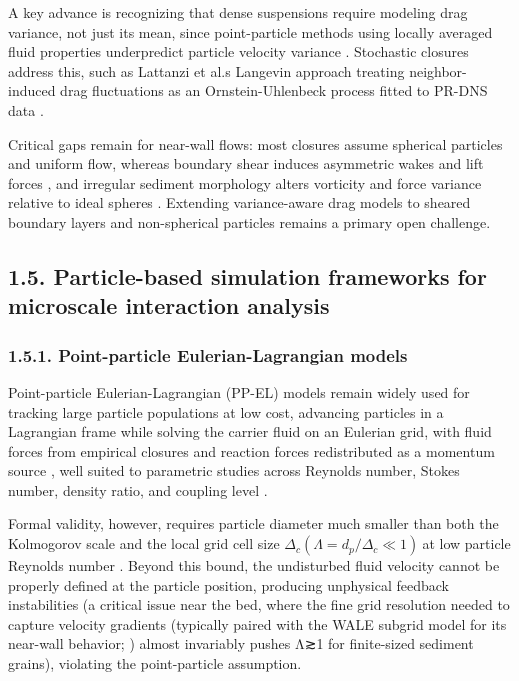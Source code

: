 A key advance is recognizing that dense suspensions require modeling drag variance, not just its mean, since point-particle methods using locally averaged fluid properties underpredict particle velocity variance \cite{brandt__2022,moore__2019}. Stochastic closures address this, such as Lattanzi et al.\textquotesingle s \cite{lattanzi__2021} Langevin approach treating neighbor-induced drag fluctuations as an Ornstein-Uhlenbeck process fitted to PR-DNS data \cite{osnes__2025}.

Critical gaps remain for near-wall flows: most closures assume spherical particles and uniform flow, whereas boundary shear induces asymmetric wakes and lift forces \cite{PEND_Costa2020,PEND_Costa2021}, and irregular sediment morphology alters vorticity and force variance relative to ideal spheres \cite{sanjeevi__2022,PEND_Zhao2024}. Extending variance-aware drag models to sheared boundary layers and non-spherical particles remains a primary open challenge.

\subsection{1.5. Particle-based simulation frameworks for microscale interaction analysis}

\subsubsection{1.5.1. Point-particle Eulerian-Lagrangian models}

Point-particle Eulerian-Lagrangian (PP-EL) models remain widely used for tracking large particle populations at low cost, advancing particles in a Lagrangian frame while solving the carrier fluid on an Eulerian grid, with fluid forces from empirical closures and reaction forces redistributed as a momentum source \cite{messa__2021,PEND_Shao2012,PEND_Zhang2023}, well suited to parametric studies across Reynolds number, Stokes number, density ratio, and coupling level \cite{PEND_Vreman2007,vreman__2015,zhou__2020}.

Formal validity, however, requires particle diameter much smaller than both the Kolmogorov scale and the local grid cell size \(\Delta_{c}(\Lambda = d_{p}/\Delta_{c} \ll 1)\ \)at low particle Reynolds number \cite{balachandar__2010,elghobashi__1994,horwitz__2016,PEND_Horwitz2018}. Beyond this bound, the undisturbed fluid velocity cannot be properly defined at the particle position, producing unphysical feedback instabilities \cite{horwitz__2016} (a critical issue near the bed, where the fine grid resolution needed to capture velocity gradients (typically paired with the WALE subgrid model for its near-wall behavior; \cite{PEND_Nicaud1999}) almost invariably pushes Λ≳1 for finite-sized sediment grains), violating the point-particle assumption.

